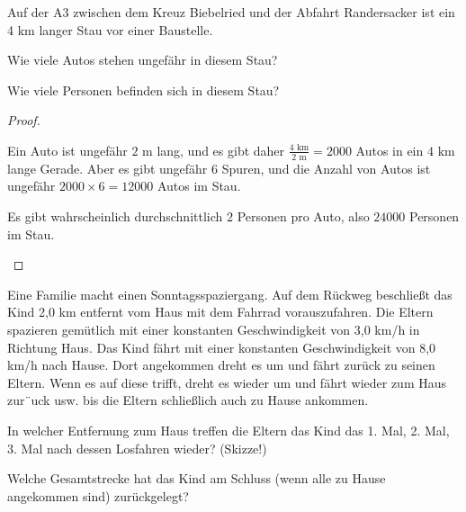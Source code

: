 \begin{Problem}
	Auf der A3 zwischen dem Kreuz Biebelried und der Abfahrt Randersacker ist ein 4 km langer Stau vor einer Baustelle.
	\begin{parts}
	\item Wie viele Autos stehen ungef\"{a}hr in diesem Stau?	
	\item Wie viele Personen befinden sich in diesem Stau?
	\end{parts}
\end{Problem}
\begin{proof}
	\begin{parts}
	\item Ein Auto ist ungef\"{a}hr $2$ m lang, und es gibt daher $\frac{4\text{ km}}{2\text{ m}}=2000$ Autos in ein $4\text{ km}$ lange Gerade. Aber es gibt ungef\"{a}hr 6 Spuren, und die Anzahl von Autos ist ungef\"{a}hr $2000\times 6 = 12000$ Autos im Stau.
	\item Es gibt wahrscheinlich durchschnittlich $2$ Personen pro Auto, also $24000$ Personen im Stau. \qedhere
	\end{parts}
\end{proof}
\begin{Problem}
	Eine Familie macht einen Sonntagsspaziergang. Auf dem R\"{u}ckweg beschließt das Kind 2,0 km entfernt vom Haus mit dem Fahrrad vorauszufahren. Die Eltern spazieren gem\"{u}tlich mit einer konstanten Geschwindigkeit von 3,0 km/h in Richtung Haus. Das Kind f\"{a}hrt mit einer konstanten Geschwindigkeit von 8,0 km/h nach Hause. Dort angekommen dreht es um und f\"{a}hrt zur\"{u}ck zu seinen Eltern. Wenn es auf diese trifft, dreht es wieder um und f\"{a}hrt wieder zum Haus zur¨uck usw. bis die Eltern schließlich auch zu Hause ankommen.
	\begin{parts}
	\item In welcher Entfernung zum Haus treffen die Eltern das Kind das 1. Mal, 2. Mal, 3. Mal nach dessen Losfahren wieder? (Skizze!)
	\item Welche Gesamtstrecke hat das Kind am Schluss (wenn alle zu Hause angekommen sind) zur\"{u}ckgelegt?
	\end{parts}
\end{Problem}
